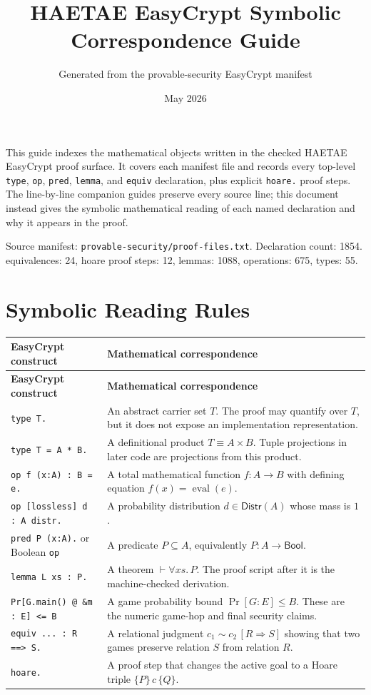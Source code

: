 \documentclass[10pt]{article}
\title{HAETAE EasyCrypt Symbolic Correspondence Guide}
\author{Generated from the provable-security EasyCrypt manifest}
\date{May 2026}
\newcommand{\file}[1]{\nolinkurl{#1}}
\begin{document}
\maketitle

This guide indexes the mathematical objects written in the checked HAETAE EasyCrypt proof surface.
It covers each manifest file and records every top-level \texttt{type}, \texttt{op}, \texttt{pred},
\texttt{lemma}, and \texttt{equiv} declaration, plus explicit \texttt{hoare.} proof steps.
The line-by-line companion guides preserve every source line; this document instead gives the symbolic
mathematical reading of each named declaration and why it appears in the proof.

\medskip
\noindent Source manifest: \file{provable-security/proof-files.txt}.
\noindent Declaration count: 1854. equivalences: 24, hoare proof steps: 12, lemmas: 1088, operations: 675, types: 55.

\tableofcontents

\section{Symbolic Reading Rules}
\begin{longtable}{L{0.22\textwidth}L{0.70\textwidth}}
\toprule
\textbf{EasyCrypt construct} & \textbf{Mathematical correspondence} \\
\midrule
\endfirsthead
\toprule
\textbf{EasyCrypt construct} & \textbf{Mathematical correspondence} \\
\midrule
\endhead
\texttt{type T.} & An abstract carrier set \(T\).  The proof may quantify over \(T\), but it does not expose an implementation representation. \\
\texttt{type T = A * B.} & A definitional product \(T \equiv A \times B\).  Tuple projections in later code are projections from this product. \\
\texttt{op f (x:A) : B = e.} & A total mathematical function \(f : A \to B\) with defining equation \(f(x)=\operatorname{eval}(e)\). \\
\texttt{op [lossless] d : A distr.} & A probability distribution \(d \in \mathsf{Distr}(A)\) whose mass is \(1\). \\
\texttt{pred P (x:A).} or Boolean \texttt{op} & A predicate \(P \subseteq A\), equivalently \(P:A\to\mathsf{Bool}\). \\
\texttt{lemma L xs : P.} & A theorem \(\vdash \forall xs.\,P\).  The proof script after it is the machine-checked derivation. \\
\texttt{Pr[G.main() @ \&m : E] <= B} & A game probability bound \(\Pr[G:E]\le B\).  These are the numeric game-hop and final security claims. \\
\texttt{equiv ... : R ==> S.} & A relational judgment \(c_1\sim c_2\,[R\Rightarrow S]\) showing that two games preserve relation \(S\) from relation \(R\). \\
\texttt{hoare.} & A proof step that changes the active goal to a Hoare triple \(\{P\}\,c\,\{Q\}\). \\
\bottomrule
\end{longtable}
\end{document}
